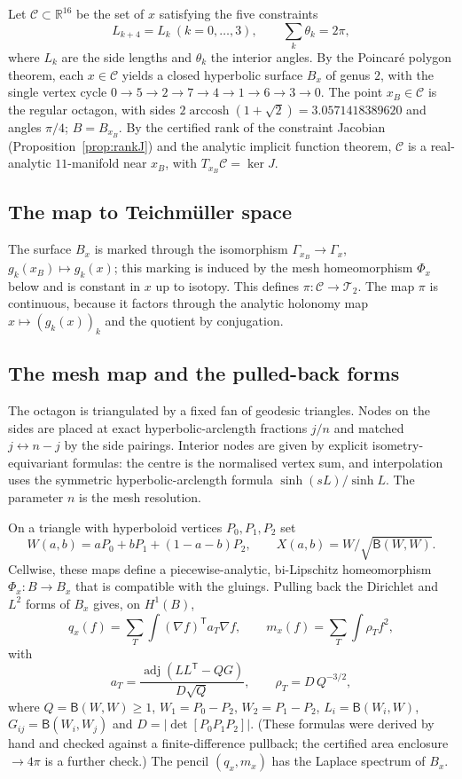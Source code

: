 \documentclass[11pt]{amsart}
\theoremstyle{definition}
\theoremstyle{remark}
\newcommand{\R}{\mathbb{R}}
\newcommand{\Teich}{\mathcal{T}_2}
\newcommand{\Oct}{\mathcal{C}}
\newcommand{\arccosh}{\operatorname{arccosh}}
\newcommand{\xB}{x_B}
\begin{document}
Let $\Oct\subset\R^{16}$ be the set of $x$ satisfying the five constraints
\[
L_{k+4}=L_k\ (k=0,\dots,3),\qquad \textstyle\sum_{k}\theta_k=2\pi,
\]
where $L_k$ are the side lengths and $\theta_k$ the interior angles. By the Poincar\'e polygon
theorem, each $x\in\Oct$ yields a closed hyperbolic surface $B_x$ of genus $2$, with the single
vertex cycle $0\to5\to2\to7\to4\to1\to6\to3\to0$. The point $\xB\in\Oct$ is the regular
octagon, with sides $2\arccosh(1+\sqrt2)=3.0571418389620$ and angles $\pi/4$; $B=B_{\xB}$.
By the certified rank of the constraint Jacobian (Proposition~\ref{prop:rankJ}) and the analytic
implicit function theorem, $\Oct$ is a real-analytic $11$-manifold near $\xB$, with
$T_{\xB}\Oct=\ker J$.

\subsection{The map to Teichm\"uller space}
The surface $B_x$ is marked through the isomorphism $\Gamma_{\xB}\to\Gamma_x$,
$g_k(\xB)\mapsto g_k(x)$; this marking is induced by the mesh homeomorphism $\Phi_x$ below and is
constant in $x$ up to isotopy. This defines $\pi\colon\Oct\to\Teich$. The map $\pi$ is
continuous, because it factors through the analytic holonomy map $x\mapsto(g_k(x))_k$ and the
quotient by conjugation.

\subsection{The mesh map and the pulled-back forms}\label{subsec:mesh}
The octagon is triangulated by a fixed fan of geodesic triangles. Nodes on the sides are placed
at exact hyperbolic-arclength fractions $j/n$ and matched $j\leftrightarrow n-j$ by the side
pairings. Interior nodes are given by explicit isometry-equivariant formulas: the centre is the
normalised vertex sum, and interpolation uses the symmetric hyperbolic-arclength formula
$\sinh(sL)/\sinh L$. The parameter $n$ is the mesh resolution.

On a triangle with hyperboloid vertices $P_0,P_1,P_2$ set
\[
W(a,b)=aP_0+bP_1+(1-a-b)P_2,\qquad X(a,b)=W/\sqrt{\mathsf B(W,W)}.
\]
Cellwise, these maps define a piecewise-analytic, bi-Lipschitz homeomorphism
$\Phi_x\colon B\to B_x$ that is compatible with the gluings. Pulling back the Dirichlet and
$L^2$ forms of $B_x$ gives, on $H^1(B)$,
\begin{equation}\label{eq:forms}
q_x(f)=\sum_T\int(\nabla f)^{\mathsf T}a_T\nabla f,\qquad
m_x(f)=\sum_T\int\rho_T f^2,
\end{equation}
with
\[
a_T=\frac{\operatorname{adj}(LL^{\mathsf T}-QG)}{D\sqrt Q},\qquad \rho_T=D\,Q^{-3/2},
\]
where $Q=\mathsf B(W,W)\ge1$, $W_1=P_0-P_2$, $W_2=P_1-P_2$, $L_i=\mathsf B(W_i,W)$,
$G_{ij}=\mathsf B(W_i,W_j)$ and $D=|\det[P_0P_1P_2]|$. (These formulas were derived by hand and
checked against a finite-difference pullback; the certified area enclosure $\to4\pi$ is a
further check.) The pencil $(q_x,m_x)$ has the Laplace spectrum of $B_x$.
\end{document}
